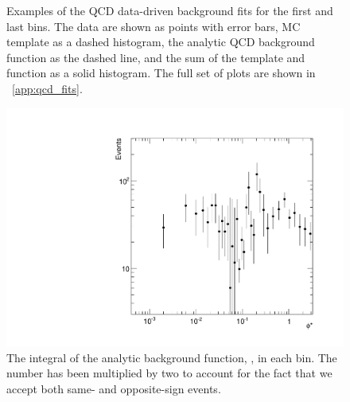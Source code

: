 \begin{figure}[!htbp]
\begin{subfigure}[b]{\SideBySidePlotWidth}
        \caption{}
        \label{fig:qcd_fit_example_34}
    \end{subfigure}
    \caption[
       Examples of the QCD data-driven background fits.
    ]{
       Examples of the QCD data-driven background fits for the first and last
       \phistar bins. The data are shown as points with error bars, MC template
       as a dashed histogram, the analytic QCD background function as the
       dashed line, and the sum of the template and function as a solid
       histogram. The full set of plots are shown in \APP~\ref{app:qcd_fits}.
    }
    \label{fig:qcd_example_fits}
\end{figure}

\begin{figure}[!htbp]
    \centering
    \includegraphics[width=\textwidth]{figures/qcd_phistar.pdf}
    \caption[
        The integral of the analytic background function in each \phistar bin.
    ]{
        The integral of the analytic background function, \BGFunc, in each
        \phistar bin. The number has been multiplied by two to account for the
        fact that we accept both same- and opposite-sign events.
    }
    \label{fig:qcd_phistar}
\end{figure}
